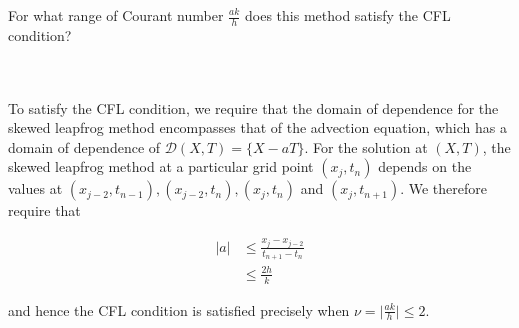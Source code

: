 For what range of Courant number $\frac{ak}{h}$ does this method satisfy the CFL condition?

\begin{solution}\ \\\\
    To satisfy the CFL condition, we require that the domain of dependence for the skewed leapfrog method encompasses
    that of the advection equation, which has a domain of dependence of $\mathcal{D}(X, T) = \{X - aT\}$. For the 
    solution at $(X, T)$, the skewed leapfrog method at a particular grid point $(x_j, t_n)$ depends on the values 
    at $(x_{j-2}, t_{n-1}), (x_{j-2}, t_n), (x_{j}, t_{n})$ and $(x_{j}, t_{n+1})$. We therefore require that

    \begin{align*}
        |a| &\le \frac{x_{j} - x_{j-2}}{t_{n+1} - t_{n}} \\
            &\le \frac{2h}{k} 
    \end{align*}

    and hence the CFL condition is satisfied precisely when $\nu = \big| \frac{ak}{h} \big| \le 2$.
    
    \ \\
\end{solution}